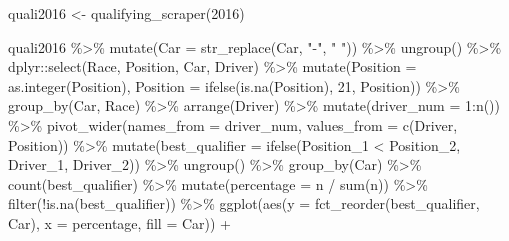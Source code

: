 \documentclass[
]{book}
\newenvironment{Shaded}{\begin{snugshade}}{\end{snugshade}}
\newcommand{\AttributeTok}[1]{\textcolor[rgb]{0.77,0.63,0.00}{#1}}
\newcommand{\DecValTok}[1]{\textcolor[rgb]{0.00,0.00,0.81}{#1}}
\newcommand{\FunctionTok}[1]{\textcolor[rgb]{0.00,0.00,0.00}{#1}}
\newcommand{\NormalTok}[1]{#1}
\newcommand{\OtherTok}[1]{\textcolor[rgb]{0.56,0.35,0.01}{#1}}
\newcommand{\SpecialCharTok}[1]{\textcolor[rgb]{0.00,0.00,0.00}{#1}}
\newcommand{\StringTok}[1]{\textcolor[rgb]{0.31,0.60,0.02}{#1}}
\begin{document}
\begin{Shaded}
\begin{Highlighting}[]
\NormalTok{quali2016 }\OtherTok{\textless{}{-}} \FunctionTok{qualifying\_scraper}\NormalTok{(}\DecValTok{2016}\NormalTok{)}

\NormalTok{quali2016 }\SpecialCharTok{\%\textgreater{}\%}
  \FunctionTok{mutate}\NormalTok{(}\AttributeTok{Car =} \FunctionTok{str\_replace}\NormalTok{(Car, }\StringTok{"{-}"}\NormalTok{, }\StringTok{" "}\NormalTok{)) }\SpecialCharTok{\%\textgreater{}\%} 
  \FunctionTok{ungroup}\NormalTok{() }\SpecialCharTok{\%\textgreater{}\%}
\NormalTok{  dplyr}\SpecialCharTok{::}\FunctionTok{select}\NormalTok{(Race, Position, Car, Driver) }\SpecialCharTok{\%\textgreater{}\%}
  \FunctionTok{mutate}\NormalTok{(}\AttributeTok{Position =} \FunctionTok{as.integer}\NormalTok{(Position),}
         \AttributeTok{Position =} \FunctionTok{ifelse}\NormalTok{(}\FunctionTok{is.na}\NormalTok{(Position), }\DecValTok{21}\NormalTok{, Position)) }\SpecialCharTok{\%\textgreater{}\%} 
  \FunctionTok{group\_by}\NormalTok{(Car, Race) }\SpecialCharTok{\%\textgreater{}\%} 
  \FunctionTok{arrange}\NormalTok{(Driver) }\SpecialCharTok{\%\textgreater{}\%} 
  \FunctionTok{mutate}\NormalTok{(}\AttributeTok{driver\_num =} \DecValTok{1}\SpecialCharTok{:}\FunctionTok{n}\NormalTok{()) }\SpecialCharTok{\%\textgreater{}\%} 
  \FunctionTok{pivot\_wider}\NormalTok{(}\AttributeTok{names\_from =} \StringTok{\textquotesingle{}driver\_num\textquotesingle{}}\NormalTok{, }\AttributeTok{values\_from =} \FunctionTok{c}\NormalTok{(}\StringTok{\textquotesingle{}Driver\textquotesingle{}}\NormalTok{, }\StringTok{\textquotesingle{}Position\textquotesingle{}}\NormalTok{)) }\SpecialCharTok{\%\textgreater{}\%}
  \FunctionTok{mutate}\NormalTok{(}\AttributeTok{best\_qualifier =} \FunctionTok{ifelse}\NormalTok{(Position\_1 }\SpecialCharTok{\textless{}}\NormalTok{ Position\_2, Driver\_1, Driver\_2)) }\SpecialCharTok{\%\textgreater{}\%}
  \FunctionTok{ungroup}\NormalTok{() }\SpecialCharTok{\%\textgreater{}\%}
  \FunctionTok{group\_by}\NormalTok{(Car) }\SpecialCharTok{\%\textgreater{}\%}
  \FunctionTok{count}\NormalTok{(best\_qualifier) }\SpecialCharTok{\%\textgreater{}\%}
  \FunctionTok{mutate}\NormalTok{(}\AttributeTok{percentage =}\NormalTok{ n }\SpecialCharTok{/} \FunctionTok{sum}\NormalTok{(n)) }\SpecialCharTok{\%\textgreater{}\%}
  \FunctionTok{filter}\NormalTok{(}\SpecialCharTok{!}\FunctionTok{is.na}\NormalTok{(best\_qualifier)) }\SpecialCharTok{\%\textgreater{}\%}
  \FunctionTok{ggplot}\NormalTok{(}\FunctionTok{aes}\NormalTok{(}\AttributeTok{y =} \FunctionTok{fct\_reorder}\NormalTok{(best\_qualifier, Car), }\AttributeTok{x =}\NormalTok{ percentage, }\AttributeTok{fill =}\NormalTok{ Car)) }\SpecialCharTok{+}

\end{Highlighting}
\end{Shaded}
\end{document}
